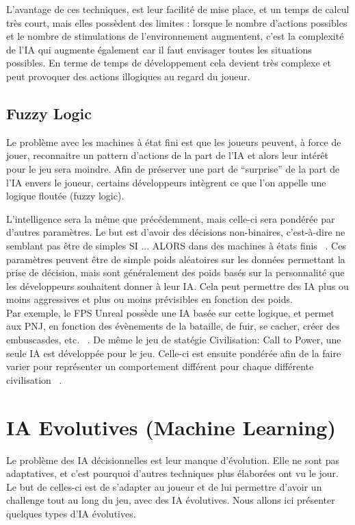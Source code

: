 \documentclass[asi]{picINSA}
\begin{document}
L'avantage de ces techniques, est leur facilité de mise place, et un temps de calcul très court, mais elles possèdent des limites : lorsque le nombre d’actions possibles et le nombre de stimulations de l’environnement augmentent, c’est la complexité de l’IA qui augmente également car il faut envisager toutes les situations possibles. En terme de temps de développement cela devient très complexe et peut provoquer des actions illogiques au regard du joueur.

\section{Fuzzy Logic}
Le problème avec les machines à état fini est que les joueurs peuvent, à force de jouer, reconnaitre un pattern d'actions de la part de l'IA et alors leur intérêt pour le jeu sera moindre. Afin de préserver une part de ``surprise'' de la part de l'IA envers le joueur, certains développeurs intègrent ce que l'on appelle une logique floutée (fuzzy logic).

L'intelligence sera la même que précédemment, mais celle-ci sera pondérée par d'autres paramètres. Le but est d'avoir des décisions non-binaires, c'est-à-dire ne semblant pas être de simples SI ... ALORS dans des machines à états finis ~\cite{CompGamesWithIntel}.
Ces paramètres peuvent être de simple poids aléatoires sur les données permettant la prise de décision, mais sont généralement des poids basés sur la personnalité que les développeurs souhaitent donner à leur IA. Cela peut permettre des IA plus ou moins aggressives et plus ou moins prévisibles en fonction des poids.\\

Par exemple, le FPS Unreal possède une IA basée sur cette logique, et permet aux PNJ, en fonction des évènements de la bataille, de fuir, se cacher, créer des embuscasdes, etc. ~\cite{CompGamesWithIntel}.
De même le jeu de statégie Civilisation: Call to Power, une seule IA est développée pour le jeu. Celle-ci est ensuite pondérée afin de la faire varier pour représenter un comportement différent pour chaque différente civilisation ~\cite{CompGamesWithIntel}. 


\chapter{IA Evolutives (Machine Learning)}
Le problème des IA décisionnelles est leur manque d'évolution. Elle ne sont pas adaptatives, et c'est pourquoi d'autres techniques plus élaborées ont vu le jour. Le but de celles-ci est de s'adapter au joueur et de lui permettre d'avoir un challenge tout au long du jeu, avec des IA évolutives. Nous allons ici présenter quelques types d'IA évolutives.
\end{document}
